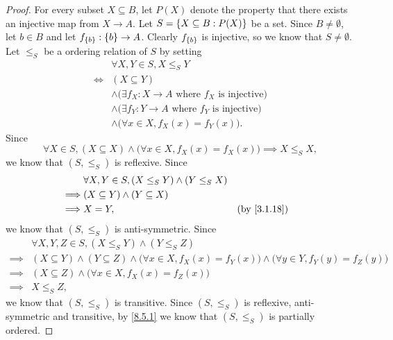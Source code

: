 \begin{proof}
  For every subset \(X \subseteq B\), let \(P(X)\) denote the property that there exists an injective map from \(X \to A\).
  Let \(S = \left\lbrace X \subseteq B : P(X)\right\rbrace\) be a set.
  Since \(B \neq \emptyset\), let \(b \in B\) and let \(f_{\left\lbrace b\right\rbrace} : \left\lbrace b\right\rbrace \to A\).
  Clearly \(f_{\left\lbrace b\right\rbrace}\) is injective, so we know that \(S \neq \emptyset\).
  Let \(\leq_S\) be a ordering relation of \(S\) by setting
  \begin{align*}
         & \forall X, Y \in S, X \leq_S Y                                           \\
    \iff & (X \subseteq Y)                                                          \\
         & \land \big(\exists f_X : X \to A \text{ where \(f_X\) is injective}\big) \\
         & \land \big(\exists f_Y : Y \to A \text{ where \(f_Y\) is injective}\big) \\
         & \land \big(\forall x \in X, f_X(x) = f_Y(x)\big).
  \end{align*}
  Since
  \[
    \forall X \in S, (X \subseteq X) \land \big(\forall x \in X, f_X(x) = f_X(x)\big) \implies X \leq_S X,
  \]
  we know that \((S, \leq_S)\) is reflexive.
  Since
  \begin{align*}
             & \forall X, Y \in S, (X \leq_S Y) \land (Y \leq_S X)                  \\
    \implies & (X \subseteq Y) \land (Y \subseteq X)                                \\
    \implies & X = Y,                                              &  & \by{3.1.18}
  \end{align*}
  we know that \((S, \leq_S)\) is anti-symmetric.
  Since
  \begin{align*}
             & \forall X, Y, Z \in S, (X \leq_S Y) \land (Y \leq_S Z)                                                                                  \\
    \implies & (X \subseteq Y) \land (Y \subseteq Z) \land \big(\forall x \in X, f_X(x) = f_Y(x)\big) \land \big(\forall y \in Y, f_Y(y) = f_Z(y)\big) \\
    \implies & (X \subseteq Z) \land \big(\forall x \in X, f_X(x) = f_Z(x)\big)                                                                        \\
    \implies & X \leq_S Z,
  \end{align*}
  we know that \((S, \leq_S)\) is transitive.
  Since \((S, \leq_S)\) is reflexive, anti-symmetric and transitive, by \cref{8.5.1} we know that \((S, \leq_S)\) is partially ordered.


\end{proof}
